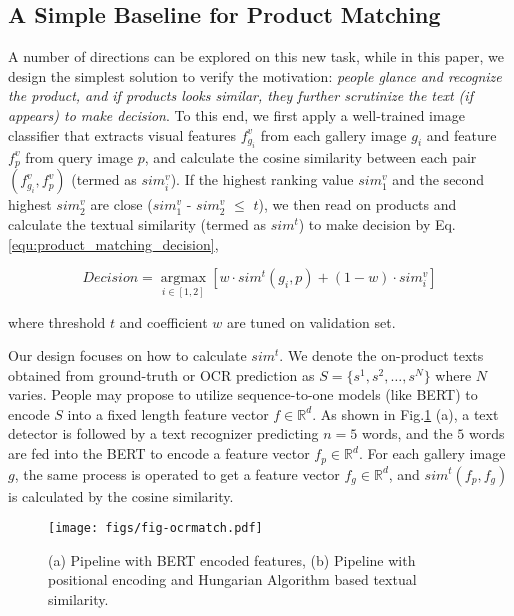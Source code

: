 \documentclass[runningheads]{llncs}
\begin{document}
\subsection{A Simple Baseline for Product Matching}
\label{product_matching_baseline}
A number of directions can be explored on this new task, while in this paper, we design the simplest solution to verify the motivation: \textit{people glance and recognize the product, and if products looks similar, they further scrutinize the text (if appears) to make decision}. To this end, we first apply a well-trained image classifier that extracts visual features $f_{g_i}^{v}$ from each gallery image $g_{i}$ and feature $f_{p}^{v}$ from query image $p$, and calculate the cosine similarity between each pair $(f_{g_i}^{v}, f_{p}^{v})$ (termed as $sim_i^{v}$). If the highest ranking value $sim_1^{v}$ and the second highest $sim_2^{v}$ are close ($sim_1^{v}$ - $sim_2^{v}$ $\leq$ $t$), we then read on products and calculate the textual similarity (termed as $sim^{t}$) to make decision by Eq.\ref{equ:product_matching_decision},

\begin{equation}
    Decision = \underset{i\in [1,2]}{\operatorname{argmax}}\left[w\cdot sim^{t}(g_{i}, p) + (1-w) \cdot sim^{v}_i\right]
\label{equ:product_matching_decision}
\end{equation}

\noindent where threshold $t$ and coefficient $w$ are tuned on validation set.

Our design focuses on how to calculate $sim^{t}$. We denote the on-product texts obtained from ground-truth or OCR prediction as $S=\{s^1,s^2,\ldots, s^N\}$ where $N$ varies. People may propose to utilize sequence-to-one models (like BERT\cite{BERT}) to encode $S$ into a fixed length feature vector $f \in \mathbb{R}^d$. As shown in Fig.\ref{fig:similarity} (a), a text detector is followed by a text recognizer predicting $n=5$ words, and the $5$ words are fed into the BERT  to encode a feature vector $f_p \in \mathbb{R}^d$. For each gallery image $g$, the same process is operated to get a feature vector $f_{g} \in \mathbb{R}^d$, and $sim^{t}(f_p, f_g)$ is calculated by the cosine similarity.

\begin{figure}[t]
    \centering
    \texttt{[image: figs/fig-ocrmatch.pdf]}
    \caption{(a) Pipeline with BERT encoded features, (b) Pipeline with positional encoding and Hungarian Algorithm based textual similarity.}
    \label{fig:similarity}
\end{figure}
\end{document}
